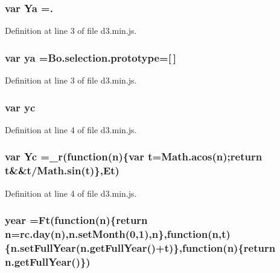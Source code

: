 \subsubsection[{Ya}]{\setlength{\rightskip}{0pt plus 5cm}var Ya =.}\label{d3_8min_8js_a45c2c602315c688f1712a166c000f602}


Definition at line 3 of file d3.\+min.\+js.

\subsubsection[{ya}]{\setlength{\rightskip}{0pt plus 5cm}var ya ={\bf Bo.\+selection.\+prototype}=[$\,$]}\label{d3_8min_8js_a93eece4752d7added4e0b011133ef1e2}


Definition at line 3 of file d3.\+min.\+js.

\subsubsection[{yc}]{\setlength{\rightskip}{0pt plus 5cm}var yc}\label{d3_8min_8js_a1428e2b1c0d5a487ade89f58fafe96cc}


Definition at line 4 of file d3.\+min.\+js.

\subsubsection[{Yc}]{\setlength{\rightskip}{0pt plus 5cm}var Yc ={\bf \+\_\+r}(function({\bf n})\{var t=Math.\+acos({\bf n});{\bf return} t\&\&t/Math.\+sin(t)\},Et)}\label{d3_8min_8js_a6098364ef16ffe34b801c084e5fe3b76}


Definition at line 4 of file d3.\+min.\+js.

\subsubsection[{year}]{ year =Ft(function({\bf n})\{{\bf return} {\bf n}={\bf rc.\+day}({\bf n}),n.\+set\+Month(0,1),{\bf n}\},function({\bf n},t)\{n.\+set\+Full\+Year(n.\+get\+Full\+Year()+t)\},function({\bf n})\{{\bf return} n.\+get\+Full\+Year()\})}\label{d3_8min_8js_a13c0fd6802235d9feb2939b676f3b28c}


